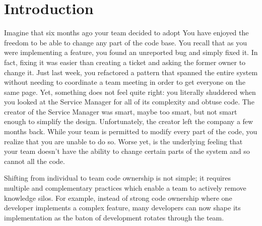 
\section{Introduction}
Imagine that six months ago your team decided to adopt  You have enjoyed the freedom to be able to change any part of the code base. You recall that as you were implementing a feature, you found an unreported bug and simply fixed it. In fact, fixing it was easier than creating a ticket and asking the former owner to change it. Just last week, you refactored a pattern that spanned the entire system without needing to coordinate a team meeting in order to get everyone on the same page. Yet, something does not feel quite right: you literally shuddered when you looked at the Service Manager for all of its complexity and obtuse code. The creator of the Service Manager was smart, maybe too smart, but not smart enough to simplify the design. Unfortunately, the creator left the company a few months back.  While your team is permitted to modify every part of the code, you realize that you are unable to do so. Worse yet, is the underlying feeling that your team doesn't have the ability to change certain parts of the system and so cannot  all the code.

Shifting from individual to team code ownership is not simple; it requires multiple and complementary practices which enable a team to actively remove knowledge silos. For example, instead of strong code ownership where one developer implements a complex feature, many developers can now shape its implementation as the baton of development rotates through the team. 



